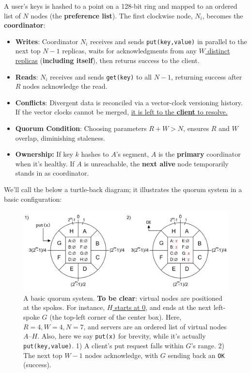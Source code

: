   \begin{Def}

    A user's keys is hashed to a point on a 128-bit ring and mapped to an ordered list of $N$ nodes (the \textbf{preference list}). The first clockwise node, $N_i$, becomes the \textbf{coordinator}:
      
        \begin{itemize}
          \item \textbf{Writes}: Coordinator $N_i$ receives and sends \texttt{put(key,value)} in parallel to the next top $N-1$ replicas, waits for acknowledgments from any \underline{$W$ distinct replicas} (\textbf{including itself}), then returns success to the client.
          \item \textbf{Reads}: $N_i$ receives and sends \texttt{get(key)} to all $N-1$, returning success after $R$ nodes acknowledge the read. 
          \item \textbf{Conflicts}: Divergent data is reconciled via a vector-clock versioning history. If the vector clocks cannot be merged, \underline{it is left to the \textbf{client} to resolve.}
          \item \textbf{Quorum Condition}: Choosing parameters $R + W > N$, ensures $R$ and $W$ overlap, diminishing staleness.
          \item \textbf{Ownership:} If key $k$ hashes to $A$'s segment, $A$ is the \textbf{primary} coordinator when it's healthy.  If $A$ is unreachable, the \textbf{next alive} node temporarily stands in as coordinator.

        \end{itemize}
      \end{Def}
      
    
    \newpage 
    \noindent
    We'll call the below a turtle-back diagram; it illustrates the quorum system in a basic configuration:
    \begin{figure}[h]
        
        \centering
        \includegraphics[width=\textwidth]{Sections/dyn/gossip.png}
        \caption{A basic quorum system. \textbf{To be clear}: virtual nodes are positioned at the spokes. For instance, \underline{$H$ starts at 0}, and ends at the next left-spoke $G$ (the top-left corner of the center box). Here, $R=4, W=4, N=7$, and servers are 
        an ordered list of virtual nodes $A$--$H$. Also, here we say \texttt{put(x)} for brevity, while it's actually \texttt{put(key,value)}.
        1) A client's put request falls within $G$'s range. 2) The next top $W-1$ nodes acknowledge, with $G$ sending back an \texttt{OK} (success).}
        \label{fig:quorum}
    \end{figure}

